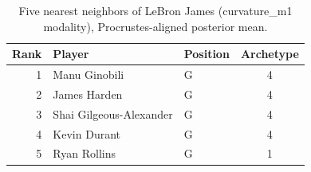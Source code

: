 \begin{table}[htbp]
  \centering\small
  \begin{tabular}{rllc}
    \toprule
    Rank & Player & Position & Archetype \\
    \midrule
    1 & Manu Ginobili & G & 4 \\
    2 & James Harden & G & 4 \\
    3 & Shai Gilgeous-Alexander & G & 4 \\
    4 & Kevin Durant & G & 4 \\
    5 & Ryan Rollins & G & 1 \\
    \bottomrule
  \end{tabular}
  \caption{Five nearest neighbors of LeBron James (curvature_m1 modality), Procrustes-aligned posterior mean.}
  \label{tab:LeBron_James_neighbors_curvature_m1}
\end{table}

